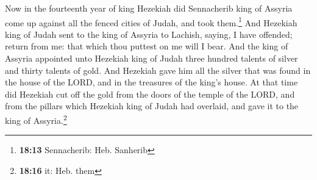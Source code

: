  Now in the fourteenth year of king Hezekiah did
Sennacherib king of Assyria come up against all the fenced cities of
Judah, and took them.\footnote{\textbf{18:13} Sennacherib: Heb. Sanherib}
 And Hezekiah king of Judah sent to the king of Assyria
to Lachish, saying, I have offended; return from me: that which thou
puttest on me will I bear. And the king of Assyria appointed unto
Hezekiah king of Judah three hundred talents of silver and thirty
talents of gold.  And Hezekiah gave him all the silver
that was found in the house of the LORD, and in the treasures of the
king's house.  At that time did Hezekiah cut off the gold
from the doors of the temple of the LORD, and from the pillars which
Hezekiah king of Judah had overlaid, and gave it to the king of
Assyria.\footnote{\textbf{18:16} it: Heb. them}


